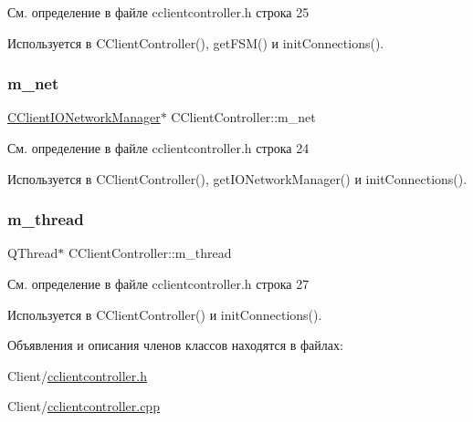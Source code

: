 См. определение в файле cclientcontroller.\+h строка 25



Используется в C\+Client\+Controller(), get\+F\+S\+M() и init\+Connections().

\hypertarget{class_c_client_controller_ae97793346f702b77829129673408df48}{}\label{class_c_client_controller_ae97793346f702b77829129673408df48} 
\subsubsection{\texorpdfstring{m\+\_\+net}{m\_net}}
{\footnotesize\ttfamily \hyperlink{class_c_client_i_o_network_manager}{C\+Client\+I\+O\+Network\+Manager}$\ast$ C\+Client\+Controller\+::m\+\_\+net\hspace{0.3cm}{\ttfamily [private]}}



См. определение в файле cclientcontroller.\+h строка 24



Используется в C\+Client\+Controller(), get\+I\+O\+Network\+Manager() и init\+Connections().

\hypertarget{class_c_client_controller_ab573eef5149837a53b276c928d2b680d}{}\label{class_c_client_controller_ab573eef5149837a53b276c928d2b680d} 
\subsubsection{\texorpdfstring{m\+\_\+thread}{m\_thread}}
{\footnotesize\ttfamily Q\+Thread$\ast$ C\+Client\+Controller\+::m\+\_\+thread\hspace{0.3cm}{\ttfamily [private]}}



См. определение в файле cclientcontroller.\+h строка 27



Используется в C\+Client\+Controller() и init\+Connections().



Объявления и описания членов классов находятся в файлах\+:\begin{DoxyCompactItemize}
\item 
Client/\hyperlink{cclientcontroller_8h}{cclientcontroller.\+h}\item 
Client/\hyperlink{cclientcontroller_8cpp}{cclientcontroller.\+cpp}\end{DoxyCompactItemize}
